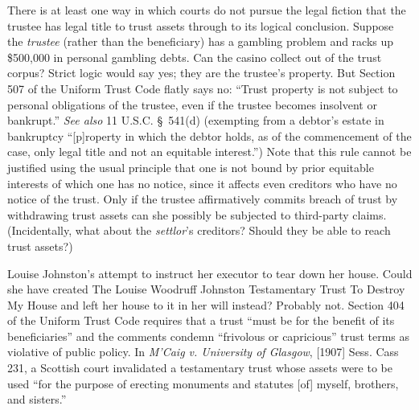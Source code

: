 
\item There is at least one way in which courts do not pursue the legal fiction
that the trustee has legal title to trust assets through to its logical
conclusion. Suppose the \textit{trustee} (rather than the beneficiary) has a
gambling problem and racks up \$500,000 in personal gambling debts. Can the
casino collect out of the trust corpus? Strict logic would say yes; they are the
trustee's property. But Section 507 of the Uniform Trust Code flatly says no:
``Trust property is not subject to personal obligations of the trustee, even if
the trustee becomes insolvent or bankrupt.'' \textit{See also} 11 U.S.C.
\S~541(d) (exempting from a debtor's estate in bankruptcy ``[p]roperty in which
the debtor holds, as of the commencement of the case, only legal title and not
an equitable interest.'') Note that this rule cannot be justified using the
usual principle that one is not bound by prior equitable interests of which one
has no notice, since it affects even creditors who have no notice of the trust.
Only if the trustee affirmatively commits breach of trust by withdrawing trust
assets can she possibly be subjected to third-party claims. (Incidentally, what
about the \textit{settlor}'s creditors? Should they be able to reach trust
assets?)

\item
{} Louise
Johnston's attempt to instruct her executor to tear down her house. Could she
have created The Louise Woodruff Johnston Testamentary Trust To Destroy My House
and left her house to it in her will instead? Probably not. Section 404 of the
Uniform Trust Code requires that a trust ``must be for the benefit of its
beneficiaries'' and the comments condemn ``frivolous or capricious'' trust terms
as violative of public policy. In \textit{M'Caig v. University of Glasgow},
[1907] Sess. Cass 231, a Scottish court invalidated a testamentary trust whose
assets were to be used ``for the purpose of erecting monuments and statutes [of]
myself, brothers, and sisters.''
